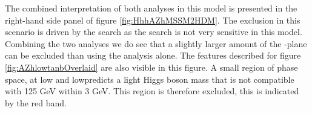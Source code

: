 The combined interpretation of both analyses in this model is presented in the right-hand side panel of
figure \ref{fig:HhhAZhMSSM2HDM}.
The exclusion in this scenario is driven by the \AtoZh search as the \Htohh search is not
very sensitive in this model. Combining the two analyses we do see that a slightly larger amount
of the \mA-\tanb plane can be excluded than using the \AtoZhtolltautau analysis alone. The features
described for figure \ref{fig:AZhlowtanbOverlaid} are also visible in this figure. A small region of phase
space, at low \mA and low\tanb predicts a light Higgs boson mass that is not compatible with 125 GeV within 3 GeV.
This region is therefore excluded, this is indicated by the red band. 



